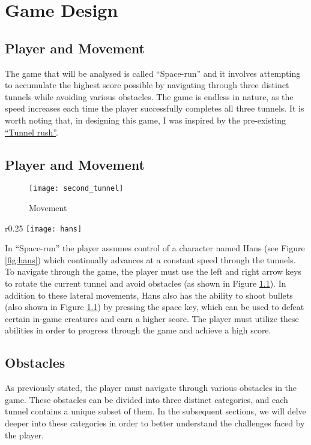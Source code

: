 \chapter{Game Design}
\section{Player and Movement}

The game that will be analysed is called ``Space-run'' and it involves attempting to accumulate the highest score possible by navigating through three distinct tunnels while avoiding various obstacles. The game is endless in nature, as the speed increases each time the player successfully completes all three tunnels. It is worth noting that, in designing this game, I was inspired by the pre-existing \href{https://tunnelrush2.com/}{``Tunnel rush''}.

\section{Player and Movement}

\begin{figure}[h]
    \centering
    \texttt{[image: second\_tunnel]}
    \caption{Movement}
    \label{fig:snd_tunnel}
\end{figure}

\begin{wrapfigure}{r}{0.25\textwidth}
    \centering
    \texttt{[image: hans]}
    \caption{Hans}
    \label{fig:hans}
\end{wrapfigure}

In ``Space-run'' the player assumes control of a character named Hans (see Figure \ref{fig:hans}) which continually advances at a constant speed through the tunnels. To navigate through the game, the player must use the left and right arrow keys to rotate the current tunnel and avoid obstacles (as shown in Figure \ref{fig:snd_tunnel}). In addition to these lateral movements, Hans also has the ability to shoot bullets (also shown in Figure \ref{fig:snd_tunnel}) by pressing the space key, which can be used to defeat certain in-game creatures and earn a higher score. The player must utilize these abilities in order to progress through the game and achieve a high score.

\section{Obstacles}
As previously stated, the player must navigate through various obstacles in the game. These obstacles can be divided into three distinct categories, and each tunnel contains a unique subset of them. In the subsequent sections, we will delve deeper into these categories in order to better understand the challenges faced by the player.


